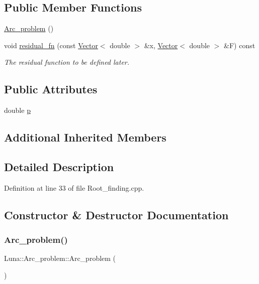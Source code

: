 \subsection*{Public Member Functions}
\begin{DoxyCompactItemize}
\item 
\hyperlink{classLuna_1_1Arc__problem_ac336f241d3d00f8799f038b7d2ab6c87}{Arc\+\_\+problem} ()
\item 
void \hyperlink{classLuna_1_1Arc__problem_aeb5e14b8b06d0ad0f8b42cb280836f97}{residual\+\_\+fn} (const \hyperlink{classLuna_1_1Vector}{Vector}$<$ double $>$ \&x, \hyperlink{classLuna_1_1Vector}{Vector}$<$ double $>$ \&F) const
\begin{DoxyCompactList}\small\item\em The residual function to be defined later. \end{DoxyCompactList}\end{DoxyCompactItemize}
\subsection*{Public Attributes}
\begin{DoxyCompactItemize}
\item 
double \hyperlink{classLuna_1_1Arc__problem_ab747ff77d23c83ebf8e0e8ab58e9c432}{p}
\end{DoxyCompactItemize}
\subsection*{Additional Inherited Members}


\subsection{Detailed Description}


Definition at line 33 of file Root\+\_\+finding.\+cpp.



\subsection{Constructor \& Destructor Documentation}
\mbox{\label{classLuna_1_1Arc__problem_ac336f241d3d00f8799f038b7d2ab6c87}} 
\subsubsection{\texorpdfstring{Arc\+\_\+problem()}{Arc\_problem()}}
{\footnotesize\ttfamily Luna\+::\+Arc\+\_\+problem\+::\+Arc\+\_\+problem (\begin{DoxyParamCaption}{ }\end{DoxyParamCaption})\hspace{0.3cm}{\ttfamily [inline]}}



